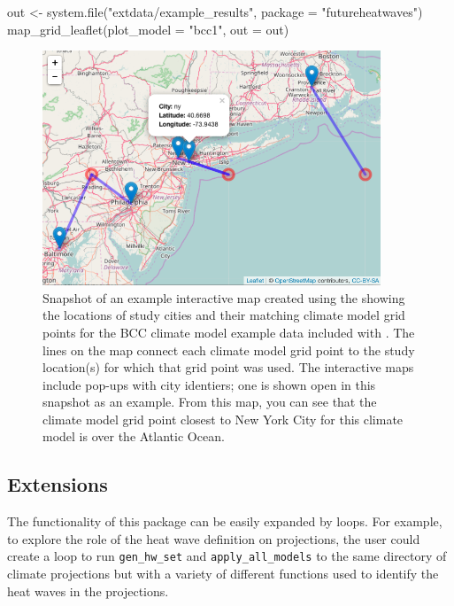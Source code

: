 \begin{Schunk}
\begin{Sinput}
out <- system.file("extdata/example_results", package = "futureheatwaves")
map_grid_leaflet(plot_model = "bcc1", out = out)
\end{Sinput}
\end{Schunk}

\begin{figure}
\begin{center}
\includegraphics[width = 0.9\textwidth]{ExampleLeaflet}
\end{center}
\caption{Snapshot of an example interactive map created using the  showing the locations of study cities and their matching climate model grid points for the BCC climate model example data included with . The lines on the map connect each climate model grid point to the study location(s) for which that grid point was used. The interactive maps include pop-ups with city identiers; one is shown open in this snapshot as an example. From this map, you can see that the climate model grid point closest to New York City for this climate model is over the Atlantic Ocean.}
\label{fig:gridmap}
\end{figure}

\subsection{Extensions}\label{extensions}

The functionality of this package can be easily expanded by loops. For
example, to explore the role of the heat wave definition on projections,
the user could create a loop to run \texttt{gen\_hw\_set} and
\texttt{apply\_all\_models} to the same directory of climate projections
but with a variety of different functions used to identify the heat
waves in the projections.

